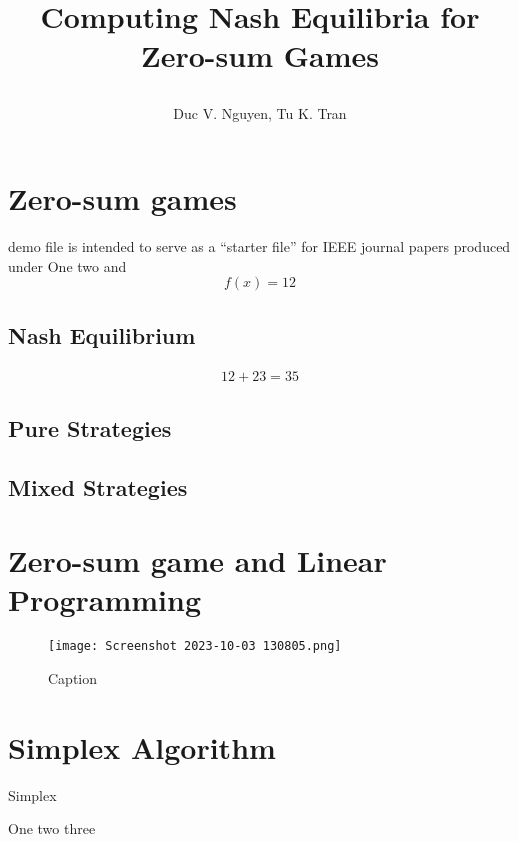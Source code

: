 \documentclass[journal, 10pt, a4paper]{IEEEtran}
\begin{document}
\title{\date{} Computing Nash Equilibria for Zero-sum Games}

\author{Duc V. Nguyen, Tu K. Tran}
\maketitle
\begin{abstract}
\blindtext
\end{abstract}

\section{Zero-sum games}
 demo file is intended to serve as a ``starter file''
for IEEE journal papers produced under
One two \cite{abook} and \cite{abbott_understanding_2010}
\begin{equation}
    f(x) = 12
\end{equation}

\subsection{Nash Equilibrium}
\begin{align}
 12 + 23 = 35
\end{align}

\subsection{Pure Strategies}
\blindtext

\subsection{Mixed Strategies}
\blindtext

\section{Zero-sum game and Linear Programming}
\blindtext

\begin{figure}[h]
    \texttt{[image: Screenshot 2023-10-03 130805.png]}
    \caption{Caption}
    \label{fig:enter-label}
\end{figure}

\section{Simplex Algorithm}
\blindtext
\begin{algorithm}
    \caption{Simplex}
    \begin{algorithmic}
    \State One two three
    \end{algorithmic}
\end{algorithm}
\begin{example}
\end{example}
\end{document}
